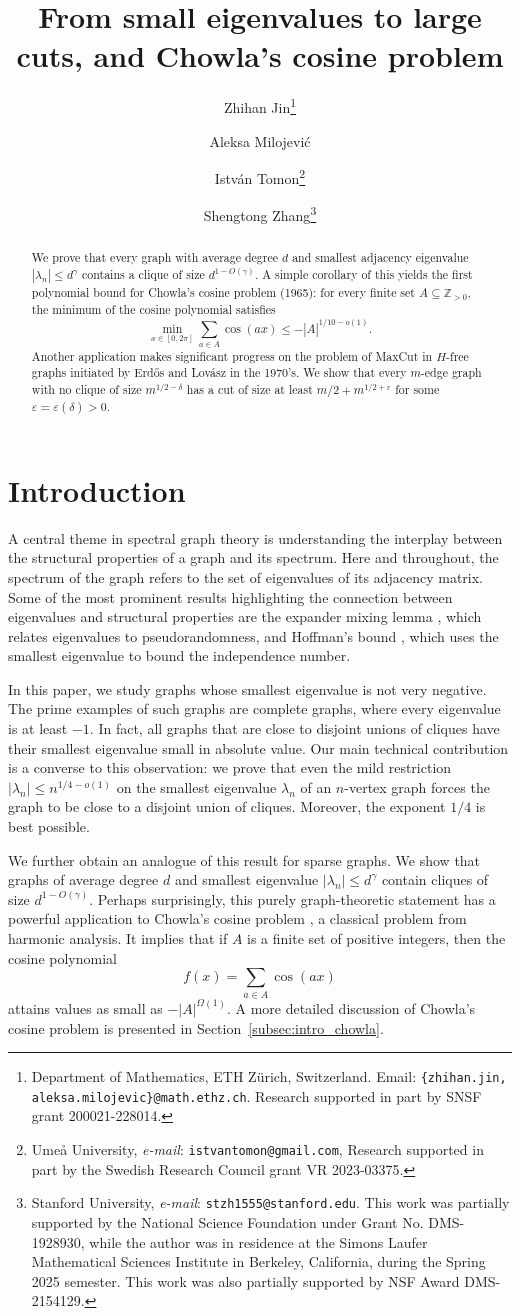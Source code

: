 \documentclass[11pt]{article}
\title{From small eigenvalues to large cuts, and Chowla's cosine problem}
\author{Zhihan Jin\thanks{Department of Mathematics, ETH Z\"urich, Switzerland. Email: {\tt \{zhihan.jin, aleksa.milojevic\}@math.ethz.ch}. Research supported in part by SNSF grant 200021-228014.}
\and Aleksa Milojevi\'c\footnotemark[1]
\and 
Istv\'an Tomon\thanks{Ume\r{a} University, \emph{e-mail}: \texttt{istvantomon@gmail.com}, Research supported in part by the Swedish Research Council grant VR 2023-03375.}
\and
Shengtong Zhang\thanks{Stanford University, \emph{e-mail}: \texttt{stzh1555@stanford.edu}. This work was partially supported by the National Science Foundation under Grant No. DMS-1928930, while the author was in residence at the Simons Laufer Mathematical Sciences Institute in Berkeley, California, during the Spring 2025 semester. This work was also partially supported by NSF Award DMS-2154129.}
}
\date{}
\theoremstyle{plain}
\theoremstyle{definition}
\newcommand{\eps}{\varepsilon}
\begin{document}
\maketitle

\begin{abstract}
    \noindent
    We prove that every graph with average degree $d$ and smallest adjacency eigenvalue $|\lambda_n|\leq d^{\gamma}$ contains a clique of size $d^{1-O(\gamma)}$. A simple corollary of this yields  the first polynomial bound for Chowla's cosine problem (1965): for every finite set $A\subseteq \mathbb{Z}_{>0}$, the minimum of the cosine polynomial satisfies $$\min_{x\in [0, 2\pi]}\sum_{a\in A}\cos(ax)\leq -|A|^{1/10-o(1)}.$$
    Another application makes significant progress on the problem of MaxCut in $H$-free graphs initiated by Erd\H{o}s and Lov\'asz in the 1970's. We show that every $m$-edge graph with no clique of size $m^{1/2-\delta}$ has a cut of size at least $m/2+m^{1/2+\eps}$ for some $\eps=\eps(\delta)>0$. 
\end{abstract}


\section{Introduction}

A central theme in spectral graph theory is understanding the interplay between the structural properties of a graph and its spectrum. Here and throughout, the spectrum of the graph refers to the set of eigenvalues of its adjacency matrix. Some of the most prominent results highlighting the connection between eigenvalues and structural properties are the expander mixing lemma \cite{AC88}, which relates eigenvalues to pseudorandomness, and Hoffman's bound \cite{H21}, which uses the smallest eigenvalue to bound the independence number. 

In this paper, we study graphs whose smallest eigenvalue is not very negative.
The prime examples of such graphs are complete graphs, where every eigenvalue is at least $-1$.
In fact, all graphs that are close to disjoint unions of cliques have their smallest eigenvalue small in absolute value. 
Our main technical contribution is a converse to this observation: we prove that even the mild restriction $|\lambda_n|\leq n^{1/4-o(1)}$ on the smallest eigenvalue $\lambda_n$ of an $n$-vertex graph forces the graph to be close to a disjoint union of cliques. 
Moreover, the exponent $1/4$ is best possible.

We further obtain an analogue of this result for sparse graphs. We show that graphs of average degree $d$ and smallest eigenvalue $|\lambda_n|\leq d^{\gamma}$ contain cliques of size $d^{1-O(\gamma)}$. Perhaps surprisingly, this purely graph-theoretic statement has a powerful application to Chowla's cosine problem \cite{C65}, a classical problem from harmonic analysis. It implies that if $A$ is a finite set of positive integers, then the cosine polynomial
$$f(x)=\sum_{a\in A}\cos(ax)$$
attains values as small as $-|A|^{\Omega(1)}$. A more detailed discussion of Chowla's cosine problem is presented in Section~\ref{subsec:intro_chowla}.
\end{document}
